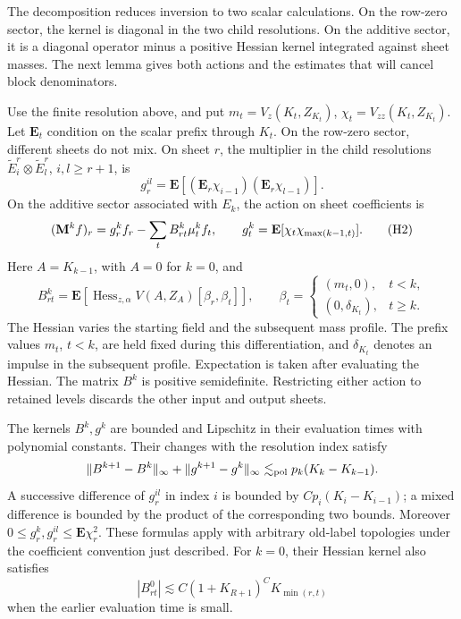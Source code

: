 The decomposition reduces inversion to two scalar calculations. On the
row-zero sector, the kernel is diagonal in the two child resolutions.
On the additive sector, it is a diagonal operator minus a positive
Hessian kernel integrated against sheet masses. The next lemma gives
both actions and the estimates that will cancel block denominators.

\begin{lemma}
\label{inv:sector-response}
Use the finite resolution above, and put
\(m_t=V_z(K_t,Z_{K_t})\), \(\chi_t=V_{zz}(K_t,Z_{K_t})\).
Let \(\mathbf E_t\) condition on the scalar prefix through \(K_t\).
On the row-zero sector, different sheets do not mix. On sheet \(r\),
the multiplier in the child resolutions
\(\widetilde E_i^r\otimes\widetilde E_l^r\), \(i,l\ge r+1\), is
\[
 g_r^{il}=\mathbf E[(\mathbf E_r\chi_{i-1})
                         (\mathbf E_r\chi_{l-1})].
\]
On the additive sector associated with \(E_k\), the action on
sheet coefficients is
\[
 ({\bf M}^k f)_r=g_r^k f_r-\sum_t B^k_{rt}\mu_t^k f_t,\qquad
 g_t^k=\mathbf E[\chi_t\chi_{\max(k-1,t)}].
 \tag{H2}\label{eq:H2}
\]
Here \(A=K_{k-1}\), with \(A=0\) for \(k=0\), and
\[
 B^k_{rt}=\mathbf E\left[
   \operatorname{Hess}_{z,\alpha}V(A,Z_A)[\beta_r,\beta_t]\right],
 \qquad
 \beta_t=\begin{cases}
 (m_t,0),&t<k,\\
 (0,\delta_{K_t}),&t\ge k.
 \end{cases}
\]
The Hessian varies the starting field and the subsequent mass profile.
The prefix values \(m_t\), \(t<k\), are held fixed during this
differentiation, and \(\delta_{K_t}\) denotes an impulse in the
subsequent profile. Expectation is taken after evaluating the Hessian.
The matrix \(B^k\) is positive semidefinite. Restricting either
action to retained levels discards the other input and output sheets.

The kernels \(B^k,g^k\) are bounded and Lipschitz in their evaluation
times with polynomial constants. Their changes with the resolution
index satisfy
\[
 \|B^{k+1}-B^k\|_\infty+\|g^{k+1}-g^k\|_\infty
 \lesssim_{\rm pol}p_k(K_k-K_{k-1}).
\]
A successive difference of \(g_r^{il}\) in index \(i\) is bounded
by \(Cp_i(K_i-K_{i-1})\); a mixed difference is bounded by the
product of the corresponding two bounds. Moreover
\(0\le g_r^k,g_r^{il}\le\mathbf E\chi_r^2\).
These formulas apply with arbitrary old-label topologies under the
coefficient convention just described. For \(k=0\), their Hessian
kernel also satisfies
\[
 |B^0_{rt}|\lesssim C(1+K_{R+1})^C K_{\min(r,t)}
\]
when the earlier evaluation time is small.
\end{lemma}


